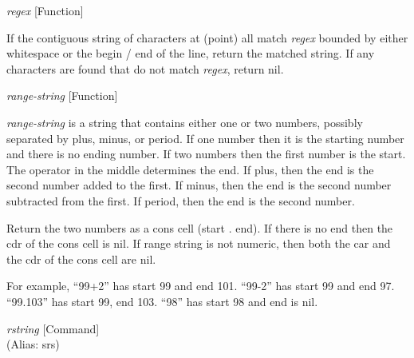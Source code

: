 \vspace{1em}
\noindent
{}
\usebox{\funcname}\emph{regex}
 \hfill [Function]

\begin{doc-string}
If the contiguous string of characters at (point) all match \emph{regex} bounded by
either whitespace or the begin / end of the line, return the matched string.  If
any characters are found that do not match \emph{regex}, return nil.
\end{doc-string}

\vspace{1em}
\noindent
{}
\usebox{\funcname}\emph{range-string}
 \hfill [Function]

\begin{doc-string}
\emph{range-string} is a string that contains either one or two numbers, possibly
separated by plus, minus, or period.  If one number then it is the starting number
and there is no ending number.  If two numbers then the first number is the start.
The operator in the middle determines the end.  If plus, then the end is the
second number added to the first.  If minus, then the end is the second number
subtracted from the first.  If period, then the end is the second number.

Return the two numbers as a cons cell (start . end).  If there is no end then the
cdr of the cons cell is nil.  If range string is not numeric, then both the car
and the cdr of the cons cell are nil.

For example, ``99+2'' has start 99 and end 101.  ``99-2'' has start 99 and end 97.
``99.103'' has start 99, end 103.  ``98'' has start 98 and end is nil.
\end{doc-string}

\vspace{1em}
\noindent
{}
\usebox{\funcname}\emph{rstring}
 \hfill [Command]\\%
 (Alias: srs)

